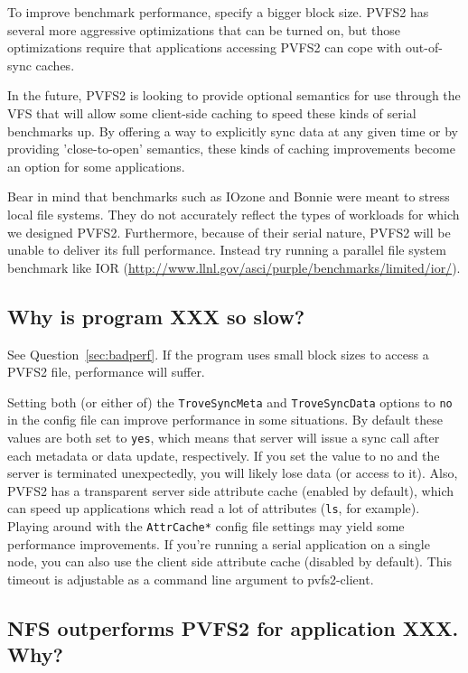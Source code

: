 \documentclass[11pt,letterpaper]{article}
\begin{document}
To improve benchmark performance, specify a bigger block size.   PVFS2
has several more aggressive optimizations that can be turned on, but
those optimizations require that applications accessing PVFS2 can cope
with out-of-sync caches.  

In the future, PVFS2 is looking to provide optional semantics for use
through the VFS that will allow some client-side caching to speed these
kinds of serial benchmarks up.  By offering a way to explicitly sync
data at any given time or by providing 'close-to-open' semantics, these
kinds of caching improvements become an option for some applications.

Bear in mind that benchmarks such as IOzone and Bonnie were meant to
stress local file systems.   They do not accurately reflect the types of
workloads for which we designed PVFS2.  Furthermore, because of their
serial nature, PVFS2 will be unable to deliver its full performance.
Instead try running a parallel file system benchmark like IOR
(\url{http://www.llnl.gov/asci/purple/benchmarks/limited/ior/}).


\subsection{Why is program XXX so slow?}
See Question~\ref{sec:badperf}.  If the program uses small block sizes to
access a PVFS2 file, performance will suffer.  

Setting both (or either of) the \texttt{TroveSyncMeta} and
\texttt{TroveSyncData} options to \texttt{no} in the config file can
improve performance in some situations.  By default these values are
both set to \texttt{yes}, which means that server will issue a sync
call after each metadata or data update, respectively.  If you set the
value to no and the server is terminated unexpectedly, you will likely
lose data (or access to it).  Also, PVFS2 has a transparent server
side attribute cache (enabled by default), which can speed up
applications which read a lot of attributes (\texttt{ls}, for
example).  Playing around with the \texttt{AttrCache*} config file
settings may yield some performance improvements.  If you're running a
serial application on a single node, you can also use the client side
attribute cache (disabled by default).  This timeout is adjustable as
a command line argument to pvfs2-client.

\subsection{NFS outperforms PVFS2 for application XXX. Why?}
\end{document}
